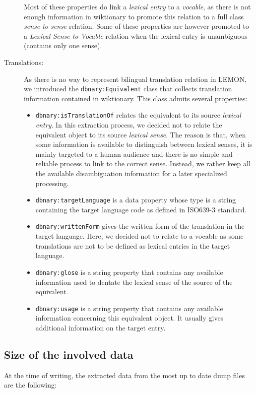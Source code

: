 \documentclass[10pt, a4paper]{article}
\begin{document}
\begin{description}
Most of these properties do link a \textit{lexical entry} to a \textit{vocable}, as there is not enough information in wiktionary to promote this relation to a full class \textit{sense to sense} relation. Some of these properties are however promoted to a \textit{Lexical Sense to Vocable} relation when the lexical entry is unambiguous (contains only one sense).
\item[Translations:] As there is no way to represent bilingual translation relation in LEMON, we introduced the \texttt{dbnary:Equivalent} class that collects translation information contained in wiktionary. This class admits several properties:
\begin{itemize}
\item \texttt{dbnary:isTranslationOf} relates the equivalent to its source \textit{lexical entry}. In this extraction process, we decided not to relate the equivalent object to its source \textit{lexical sense}. The reason is that, when some information is available to distinguish between lexical senses, it is mainly targeted to a human audience and there is no simple and reliable process to  link to the correct sense. Instead, we rather keep all the available disambiguation information for a later specialized processing.
\item \texttt{dbnary:targetLanguage} is a data property whose type is a string containing the target language code as defined in ISO639-3 standard.
\item \texttt{dbnary:writtenForm} gives the written form of the translation in the target language. Here, we decided not to relate to a vocable as some translations are not to be defined as lexical entries in the target language.
\item \texttt{dbnary:glose} is a string property that contains any available information used to dentate the lexical sense of the source of the equivalent.
\item \texttt{dbnary:usage} is a string property that contains any available information concerning this equivalent object. It usually gives additional information on the target entry.
\end{itemize}

\end{description}

\subsection{Size of the involved data}

At the time of writing, the extracted data from the most up to date dump files are the following:
\end{document}
